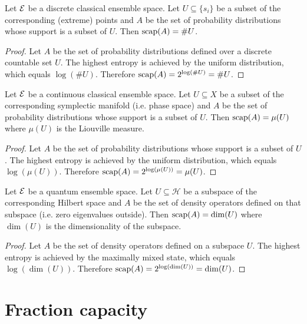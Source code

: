 \begin{mathSection}
\begin{prop}
	Let $\mathcal{E}$ be a discrete classical ensemble space. Let $U \subseteq \{s_i\}$ be a subset of the corresponding (extreme) points and $A$ be the set of probability distributions whose support is a subset of $U$. Then $\mathrm{scap}(A) = \#U$.
\end{prop}

\begin{proof}
	Let $A$ be the set of probability distributions defined over a discrete countable set $U$. The highest entropy is achieved by the uniform distribution, which equals $\log (\#U)$. Therefore $\mathrm{scap}(A) = 2^{\log(\#U)} = \#U$.
\end{proof}

\begin{prop}
	Let $\mathcal{E}$ be a continuous classical ensemble space. Let $U \subseteq X$ be a subset of the corresponding symplectic manifold (i.e. phase space) and $A$ be the set of probability distributions whose support is a subset of $U$. Then $\mathrm{scap}(A) = \mu(U)$ where $\mu(U)$ is the Liouville measure.
\end{prop}

\begin{proof}
	Let $A$ be the set of probability distributions whose support is a subset of $U$. The highest entropy is achieved by the uniform distribution, which equals $\log(\mu(U))$. Therefore $\mathrm{scap}(A) = 2^{\log(\mu(U))} = \mu(U)$.
\end{proof}

\begin{prop}
	Let $\mathcal{E}$ be a quantum ensemble space. Let $U \subseteq \mathcal{H}$ be a subspace of the corresponding Hilbert space and $A$ be the set of density operators defined on that subspace (i.e. zero eigenvalues outside). Then $\mathrm{scap}(A) = \dim(U)$ where $\dim(U)$ is the dimensionality of the subspace.
\end{prop}

\begin{proof}
	Let $A$ be the set of density operators defined on a subspace $U$. The highest entropy is achieved by the maximally mixed state, which equals $\log(\dim(U))$. Therefore $\mathrm{scap}(A) = 2^{\log(\dim(U))} = \dim(U)$.
\end{proof}
\end{mathSection}

\section{Fraction capacity}

